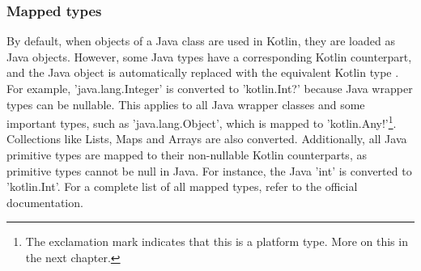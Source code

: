\documentclass[a4paper, 11pt]{article}
\begin{document}
\subsubsection{Mapped types}
  By default, when objects of a Java class are used in Kotlin, they are loaded as Java objects. However, some Java types have a corresponding Kotlin counterpart, and the Java object is automatically replaced with the equivalent Kotlin type \cite{interop-mapped-types}. For example, 'java.lang.Integer' is converted to 'kotlin.Int?' because Java wrapper types can be nullable. This applies to all Java wrapper classes and some important types, such as 'java.lang.Object', which is mapped to 'kotlin.Any!'\footnote{The exclamation mark indicates that this is a platform type. More on this in the next chapter.}. Collections like Lists, Maps and Arrays are also converted. Additionally, all Java primitive types are mapped to their non-nullable Kotlin counterparts, as primitive types cannot be null in Java. For instance, the Java 'int' is converted to 'kotlin.Int'. For a complete list of all mapped types, refer to the official documentation.
\end{document}
